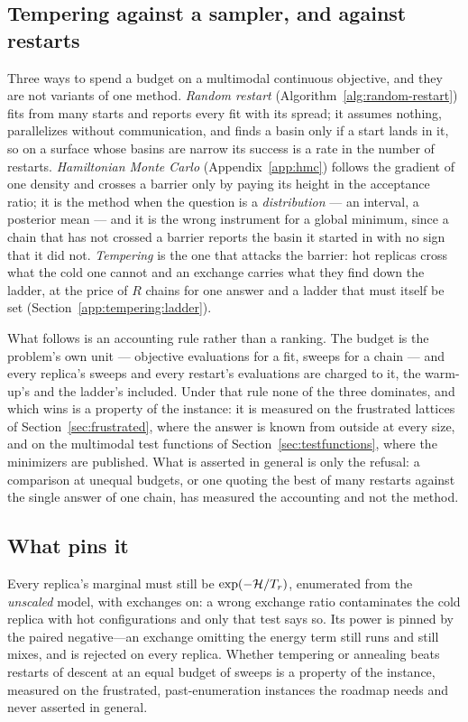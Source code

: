 \documentclass[11pt,a4paper]{article}
\begin{document}
\subsection{Tempering against a sampler, and against restarts}
\label{app:tempering:comparison}
Three ways to spend a budget on a multimodal continuous objective, and they are
not variants of one method. \emph{Random restart}
(Algorithm~\ref{alg:random-restart}) fits from many starts and reports every
fit with its spread; it assumes nothing, parallelizes without communication,
and finds a basin only if a start lands in it, so on a surface whose basins are
narrow its success is a rate in the number of restarts. \emph{Hamiltonian Monte
Carlo} (Appendix~\ref{app:hmc}) follows the gradient of one density and crosses
a barrier only by paying its height in the acceptance ratio; it is the method
when the question is a \emph{distribution} --- an interval, a posterior mean ---
and it is the wrong instrument for a global minimum, since a chain that has not
crossed a barrier reports the basin it started in with no sign that it did not.
\emph{Tempering} is the one that attacks the barrier: hot replicas cross what
the cold one cannot and an exchange carries what they find down the ladder, at
the price of $R$ chains for one answer and a ladder that must itself be set
(Section~\ref{app:tempering:ladder}).

What follows is an accounting rule rather than a ranking. The budget is the
problem's own unit --- objective evaluations for a fit, sweeps for a chain ---
and every replica's sweeps and every restart's evaluations are charged to it,
the warm-up's and the ladder's included. Under that rule none of the three
dominates, and which wins is a property of the instance: it is measured on the
frustrated lattices of Section~\ref{sec:frustrated}, where the answer is known
from outside at every size, and on the multimodal test functions of
Section~\ref{sec:testfunctions}, where the minimizers are published. What is
asserted in general is only the refusal: a comparison at unequal budgets, or
one quoting the best of many restarts against the single answer of one chain,
has measured the accounting and not the method.

\subsection{What pins it}
Every replica's marginal must still be $\exp(-\mathcal{H}/T_r)$, enumerated from
the \emph{unscaled} model, with exchanges on: a wrong exchange ratio
contaminates the cold replica with hot configurations and only that test says
so. Its power is pinned by the paired negative---an exchange omitting the
energy term still runs and still mixes, and is rejected on every replica.
Whether tempering or annealing beats restarts of descent at an equal budget of
sweeps is a property of the instance, measured on the frustrated,
past-enumeration instances the roadmap needs and never asserted in general.
\end{document}
